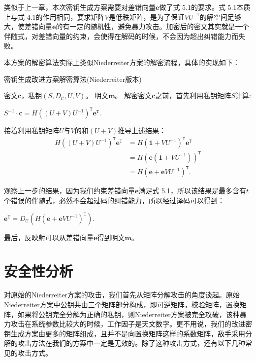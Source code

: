 类似于上一章，本次密钥生成方案需要对差错向量$\mathbf{e}$做了式 5.1的要求。式 5.1本质上与式 4.1的作用相同，要求矩阵$V$是低秩矩阵，是为了保证$VU^{-1}$的解空间足够大，使差错向量$\mathbf{e}$的有一定的随机性，避免暴力攻击。加密后的密文其实就是一个伴随式，对差错向量的约束，会使得在解码的时候，不会因为超出纠错能力而失败。

本方案的解密算法实际上类似Niederreiter方案的解密流程，具体的实现如下：

\begin{breakablealgorithm}
	\small
	\renewcommand{\algorithmicrequire}{\textbf{Input:}}
	\renewcommand{\algorithmicensure}{\textbf{Output:}}
	\caption{密钥生成改进方案解密算法(Niederreiter版本)}
	\label{alg:NewDeN}
	\begin{algorithmic}[1]
		\Require
		密文$\mathbf{c}$，私钥$(S,D_\mathcal{C},U,V)$。
		\Ensure
		明文$\mathbf{m}$。
		\State
		解密密文$\mathbf{c}$之前，首先利用私钥矩阵$S$计算:
		\begin{center}
			$S^{-1} \cdot \textbf{c} = H((U + V)U^{-1})^\mathtt{T}\mathbf{e}^\mathtt{T}.$
		\end{center}
		\State
		接着利用私钥矩阵$U$与$V$的和$(U + V)$推导上述结果：
		\begin{equation}
		\begin{aligned}
		H((U + V)U^{-1})^\mathtt{T}\mathbf{e}^\mathtt{T} &= H(\mathbf{1} +VU^{-1})^\mathtt{T}\mathbf{e}^\mathtt{T} \\
		& = H(\mathbf{e}(\mathbf{1} +VU^{-1}))^\mathtt{T} \\
		& = H(\mathbf{e} + \mathbf{e}VU^{-1})^\mathtt{T}.
		\end{aligned}
		\end{equation}
		
		\State
		观察上一步的结果，因为我们约束差错向量$\mathbf{e}$满足式 5.1，所以该结果是最多含有$t$个错误的伴随式，必然不会超过码的纠错能力，所以经过译码可以得到：
		\begin{center}
			$\mathbf{e} ^ \mathtt{T} = D_\mathcal{C}(H(\mathbf{e} + \mathbf{e}VU^{-1})^\mathtt{T}).$
		\end{center}
		
		\State
		最后，反映射可以从差错向量$\mathbf{e}$得到明文$\mathbf{m}$。		
	\end{algorithmic}
\end{breakablealgorithm}

\section{安全性分析}
对原始的Niederreiter方案的攻击，我们首先从矩阵分解攻击的角度谈起。原始Niederreiter方案中公钥共由三个矩阵部分构成，即可逆矩阵，校验矩阵，置换矩阵，如果将公钥完全分解为正确的私钥，则Niederreiter方案被完全攻破，该种暴力攻击在系统参数比较大的时候，工作因子是天文数字。更不用说，我们的改进密钥生成方案由更多的矩阵组成，且并不是向置换矩阵这样的系数矩阵，敌手采用分解的攻击方法在我们的方案中一定是无效的。除了这种攻击方式，还有以下几种常见的攻击方式。

